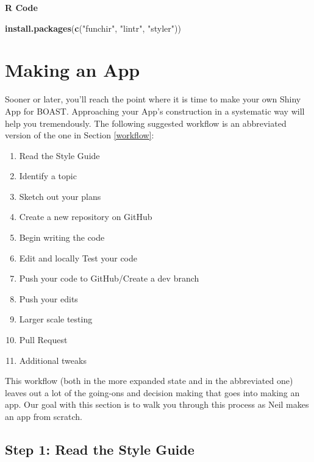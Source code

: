 \documentclass[
]{book}
\newenvironment{Shaded}{\begin{snugshade}}{\end{snugshade}}
\newcommand{\KeywordTok}[1]{\textcolor[rgb]{0.13,0.29,0.53}{\textbf{#1}}}
\newcommand{\NormalTok}[1]{#1}
\newcommand{\StringTok}[1]{\textcolor[rgb]{0.31,0.60,0.02}{#1}}
\providecommand{\tightlist}{%
  \setlength{\itemsep}{0pt}\setlength{\parskip}{0pt}}
\begin{document}
\textbf{R Code}

\begin{Shaded}
\begin{Highlighting}[]
\KeywordTok{install.packages}\NormalTok{(}\KeywordTok{c}\NormalTok{(}\StringTok{"funchir"}\NormalTok{, }\StringTok{"lintr"}\NormalTok{, }\StringTok{"styler"}\NormalTok{))}
\end{Highlighting}
\end{Shaded}

\hypertarget{makingApp}{%
\chapter{Making an App}\label{makingApp}}

Sooner or later, you'll reach the point where it is time to make your own Shiny App for BOAST. Approaching your App's construction in a systematic way will help you tremendously. The following suggested workflow is an abbreviated version of the one in Section \ref{workflow}:

\begin{enumerate}
\def\labelenumi{\arabic{enumi}.}
\tightlist
\item
  Read the Style Guide
\item
  Identify a topic
\item
  Sketch out your plans
\item
  Create a new repository on GitHub
\item
  Begin writing the code
\item
  Edit and locally Test your code
\item
  Push your code to GitHub/Create a dev branch
\item
  Push your edits
\item
  Larger scale testing
\item
  Pull Request
\item
  Additional tweaks
\end{enumerate}

This workflow (both in the more expanded state and in the abbreviated one) leaves out a lot of the going-ons and decision making that goes into making an app. Our goal with this section is to walk you through this process as Neil makes an app from scratch.

\hypertarget{step1}{%
\section{Step 1: Read the Style Guide}\label{step1}}
\end{document}
